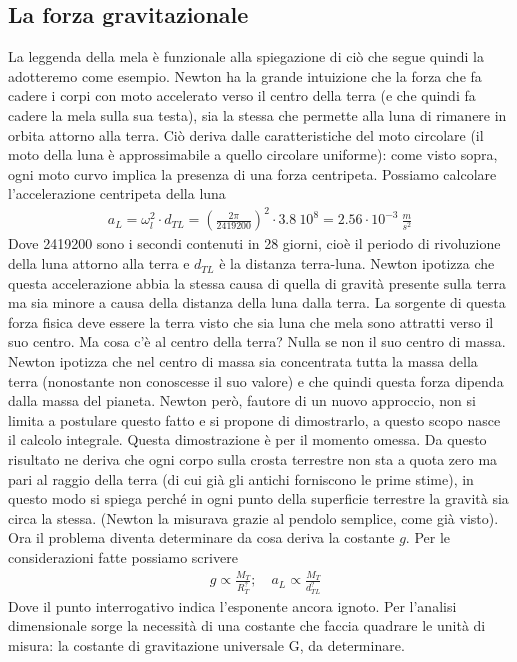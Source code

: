 \subsection{La forza gravitazionale}
La leggenda della mela è funzionale alla spiegazione di ciò che segue quindi la adotteremo come esempio. Newton ha la grande intuizione che la forza che fa cadere i corpi con moto accelerato verso il centro della terra (e che quindi fa cadere la mela sulla sua testa), sia la stessa che permette alla luna di rimanere in orbita attorno alla terra. Ciò deriva dalle caratteristiche del moto circolare (il moto della luna è approssimabile a quello circolare uniforme): come visto sopra, ogni moto curvo implica la presenza di una forza centripeta. Possiamo calcolare l'accelerazione centripeta della luna
\begin{align*}
	a_L = \omega_l^2 \cdot d_{TL} = (\frac{2 \pi}{2419200})^2 \cdot 3.8\ 10^{8}  = 2.56 \cdot10^{-3}\ \frac{m}{s^2}
\end{align*}
Dove 2419200 sono i secondi contenuti in 28 giorni, cioè il periodo di rivoluzione della luna attorno alla terra e $d_{TL}$ è la distanza terra-luna. Newton ipotizza che questa accelerazione abbia la stessa causa di quella di gravità presente sulla terra ma sia minore a causa della distanza della luna dalla terra. La sorgente di questa forza fisica deve essere la terra visto che sia luna che mela sono attratti verso il suo centro. Ma cosa c'è al centro della terra? Nulla se non il suo centro di massa. Newton ipotizza che nel centro di massa sia concentrata tutta la massa della terra (nonostante non conoscesse il suo valore) e che quindi questa forza dipenda dalla massa del pianeta. Newton però, fautore di un nuovo approccio, non si limita a postulare questo fatto e si propone di dimostrarlo, a questo scopo nasce il calcolo integrale. Questa dimostrazione è per il momento omessa. Da questo risultato ne deriva che ogni corpo sulla crosta terrestre non sta a quota zero ma pari al raggio della terra (di cui già gli antichi forniscono le prime stime), in questo modo si spiega perché in ogni punto della superficie terrestre la gravità sia circa la stessa. (Newton la misurava grazie al pendolo semplice, come già visto).\\
Ora il problema diventa determinare da cosa deriva la costante $g$. Per le considerazioni fatte possiamo scrivere
\begin{align*}
 &g \propto \frac{M_T}{R_T^?};\quad a_L \propto \frac{M_T}{d_{TL}^?}
\end{align*}
Dove il punto interrogativo indica l'esponente ancora ignoto. Per l'analisi dimensionale sorge la necessità di una costante che faccia quadrare le unità di misura: la costante di gravitazione universale G, da determinare. 
